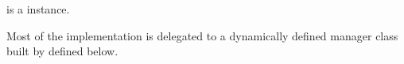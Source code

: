 \documentclass[letterpaper,10pt,spanish]{sphinxmanual}
\begin{document}
\begin{fulllineitems}
\begin{fulllineitems}
\sphinxAtStartPar
{} is a  instance.

\sphinxAtStartPar
Most of the implementation is delegated to a dynamically defined manager
class built by  defined below.

\end{fulllineitems}



\begin{fulllineitems}

\pysigstartsignatures
{}
\pysigstopsignatures
\end{fulllineitems}


\end{fulllineitems}
\end{document}

